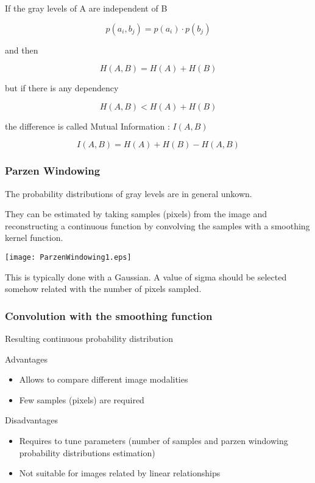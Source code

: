 If the gray levels of A are independent of B

\begin{equation}
p\left( a_{i},b_{j}\right) =p\left( a_{i}\right) \cdot p\left( b_{j}\right) 
\end{equation}


and then 

\begin{equation}
H(A,B)=H(A)+H(B)
\end{equation}


but if there is any dependency

\begin{equation}
H(A,B)<H(A)+H(B)
\end{equation}


the difference is called Mutual Information : \( I(A,B) \)

\begin{equation}
I(A,B)=H(A)+H(B)-H(A,B)
\end{equation}


\subsubsection{Parzen Windowing}

The probability distributions of gray levels are in general unkown.

They can be estimated by taking samples (pixels) from the image and
reconstructing a continuous function by convolving the samples with a smoothing
kernel function.

\texttt{[image: ParzenWindowing1.eps]}

This is typically done with a Gaussian. A value of sigma should be selected
somehow related with the number of pixels sampled.  

\subsubsection{Convolution with the
smoothing function}


Resulting continuous probability distribution 



Advantages

\begin{itemize}
\item Allows to compare different image modalities
\item Few samples (pixels) are required
\end{itemize}

Disadvantages

\begin{itemize}
\item Requires to tune parameters (number of samples and parzen windowing probability distributions estimation)
\item Not suitable for images related by linear relationships
\end{itemize}





